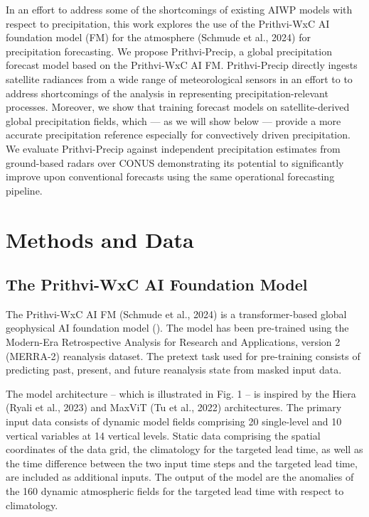 \documentclass{ametsocV6.1}
\begin{document}
In an effort to address some of the shortcomings of existing AIWP models with
respect to precipitation, this work explores the use of the Prithvi-WxC AI
foundation model (FM) for the atmosphere (Schmude et al., 2024) for
precipitation forecasting. We propose Prithvi-Precip, a global precipitation
forecast model based on the Prithvi-WxC AI FM. Prithvi-Precip directly ingests
satellite radiances from a wide range of meteorological sensors in an effort to
to address shortcomings of the analysis in representing precipitation-relevant
processes. Moreover, we show that training forecast models on satellite-derived
global precipitation fields, which — as we will show below — provide a more
accurate precipitation reference especially for convectively driven
precipitation. We evaluate Prithvi-Precip against independent precipitation
estimates from ground-based radars over CONUS demonstrating its potential to
significantly improve upon conventional forecasts using the same operational
forecasting pipeline.


\section{Methods and Data}

\label{sec:methods}

\subsection{The Prithvi-WxC AI Foundation Model}

The Prithvi-WxC AI FM (Schmude et al., 2024) is a transformer-based global
geophysical AI foundation model (). The model has been pre-trained using the
Modern-Era Retrospective Analysis for Research and Applications, version 2
(MERRA-2) reanalysis dataset. The pretext task used for pre-training consists
of predicting past, present, and future reanalysis state from masked input data.

The model architecture -- which is illustrated in Fig. 1 -- is inspired
by the Hiera (Ryali et al., 2023) and MaxViT (Tu et al., 2022) architectures.
The primary input data consists of dynamic model fields comprising 20
single-level and 10 vertical variables at 14 vertical levels. Static data
comprising the spatial coordinates of the data grid, the climatology for the
targeted lead time, as well as the time difference between the two input time
steps and the targeted lead time, are included as additional inputs. The output
of the model are the anomalies of the 160 dynamic atmospheric fields for the
targeted lead time with respect to climatology.
\end{document}
